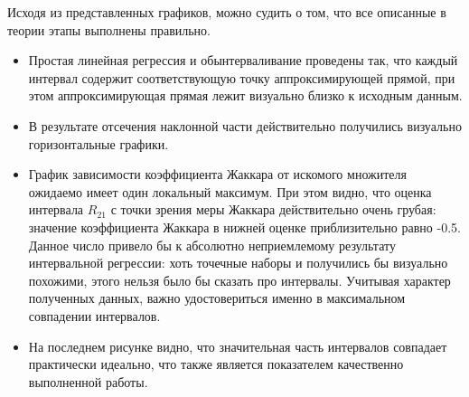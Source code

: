 Исходя из представленных графиков, можно судить о том, что все описанные в теории этапы выполнены правильно.
\begin{itemize}
\item Простая линейная регрессия и обынтерваливание проведены так, что каждый интервал содержит соответствующую точку аппроксимирующей прямой, при этом аппроксимирующая прямая лежит визуально близко к исходным данным.

\item В результате отсечения наклонной части действительно получились визуально горизонтальные графики.

\item График зависимости коэффициента Жаккара от искомого множителя ожидаемо имеет один локальный максимум. При этом видно, что оценка интервала $R_{21}$ с точки зрения меры Жаккара действительно очень грубая: значение коэффициента Жаккара в нижней оценке приблизительно равно -0.5. Данное число привело бы к абсолютно неприемлемому результату интервальной регрессии: хоть точечные наборы и получились бы визуально похожими, этого нельзя было бы сказать про интервалы. Учитывая характер полученных данных, важно удостовериться именно в максимальном совпадении интервалов.

\item На последнем рисунке видно, что значительная часть интервалов совпадает практически идеально, что также является показателем качественно выполненной работы.
\end{itemize}